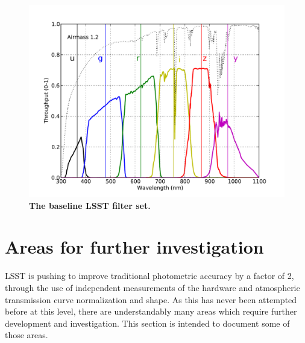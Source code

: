 \documentclass[12pt,preprint]{aastex}
\begin{document}
\begin{figure}[h!]
\includegraphics[width=5in]{filters}
\caption{{\small {\bf The baseline LSST filter set.}}
\label{fig:filterset}}
\end{figure}


\section{Areas for further investigation}
\label{sec:investigation}

LSST is pushing to improve traditional photometric accuracy by a
factor of 2, through the use of independent measurements of the
hardware and atmospheric transmission curve normalization and
shape. As this has never been attempted before at this level, there are
understandably many areas which require further development and
investigation.  This section is intended to document some of those
areas. 
\end{document}
